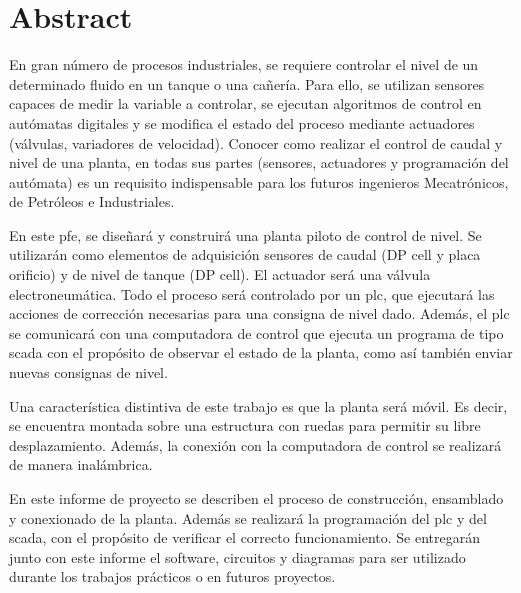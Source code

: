 \markboth{}{}
\pagestyle{empty}

\chapter*{Abstract}

En gran número de procesos industriales, se requiere controlar el
nivel de un determinado fluido en un tanque o una cañería.
Para ello, se utilizan sensores capaces de medir la variable a
controlar, se ejecutan algoritmos de control en autómatas digitales y se
modifica el estado del proceso mediante actuadores (válvulas, variadores de
velocidad).
Conocer como realizar el control de caudal y nivel de una planta, en todas sus
partes (sensores, actuadores y programación del autómata) es un requisito
indispensable para los futuros ingenieros Mecatrónicos, de Petróleos e
Industriales.

En este \gls{pfe}, se diseñará y construirá una planta piloto de control de
nivel.
Se utilizarán como elementos de adquisición sensores de caudal (DP cell y placa
orificio) y de nivel de tanque (DP cell).
El actuador será una válvula electroneumática.
Todo el proceso será controlado por un \gls{plc},
que ejecutará las acciones de
corrección necesarias para una consigna de nivel dado.
Además, el \gls{plc} se comunicará con una computadora de control que ejecuta
un programa de tipo \gls{scada} con el propósito de observar el estado de la
planta, como así también enviar nuevas consignas de nivel.

Una característica distintiva de este trabajo es que la planta será móvil.
Es decir, se encuentra montada sobre una estructura con ruedas para permitir su
libre desplazamiento.
Además, la conexión con la computadora de control se realizará de manera
inalámbrica.

En este informe de proyecto se describen el proceso de construcción,
ensamblado y conexionado de la planta.
Además se realizará la programación del \gls{plc} y del \gls{scada}, con el
propósito de verificar el correcto funcionamiento.
Se entregarán junto con este informe el software, circuitos y diagramas para
ser utilizado durante los trabajos prácticos o en futuros proyectos.
